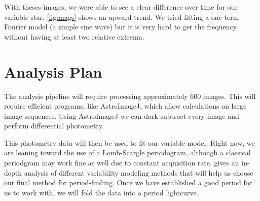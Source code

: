\documentclass[]{article}
\begin{document}
	With theses images, we were able to see a clear difference over time for our variable star. \autoref{fig:mags} shows an upward trend. We tried fitting a one term Fourier model (a simple sine wave) but it is very hard to get the frequency without having at least two relative extrema.
	
\section{Analysis Plan}

	The analysis pipeline will require processing approximately 600 images. This will require efficient programs, like AstroImageJ, which allow calculations on large image sequences. Using AstroImageJ we can dark subtract every image and perform differential photometry. 
	
	This photometry data will then be used to fit our variable model. Right now, we are leaning toward the use of a Lomb-Scargle periodogram, although a classical periodgram may work fine as well due to constant acquisition rate. \textcite{2017arXiv170309824V} gives an in-depth analysis of different variability modeling methods that will help us choose our final method for period-finding. Once we have established a good period for us to work with, we will fold the data into a period lightcurve.
	



\printbibliography

\newpage
\appendix
\end{document}

